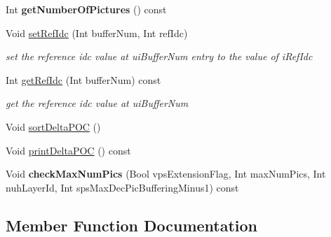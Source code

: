 \begin{DoxyCompactItemize}
Int {\bfseries get\+Number\+Of\+Pictures} () const
\item 
\mbox{\label{class_t_com_reference_picture_set_a7aa9e451882769d60654b91952b0414e}} 
Void \hyperlink{class_t_com_reference_picture_set_a7aa9e451882769d60654b91952b0414e}{set\+Ref\+Idc} (Int buffer\+Num, Int ref\+Idc)
\begin{DoxyCompactList}\small\item\em set the reference idc value at ui\+Buffer\+Num entry to the value of i\+Ref\+Idc \end{DoxyCompactList}\item 
\mbox{\label{class_t_com_reference_picture_set_a8e161d40e3ee8b234d40dcde5c8a8415}} 
Int \hyperlink{class_t_com_reference_picture_set_a8e161d40e3ee8b234d40dcde5c8a8415}{get\+Ref\+Idc} (Int buffer\+Num) const
\begin{DoxyCompactList}\small\item\em get the reference idc value at ui\+Buffer\+Num \end{DoxyCompactList}\item 
Void \hyperlink{class_t_com_reference_picture_set_a471d8a5c5c33e6d576f0831e6ee53db9}{sort\+Delta\+P\+OC} ()
\item 
Void \hyperlink{class_t_com_reference_picture_set_a8260f0649f6712db47d3836517478deb}{print\+Delta\+P\+OC} () const
\item 
\mbox{\label{class_t_com_reference_picture_set_a0178a69e3f2226b679adfaf0fe0e301a}} 
Void {\bfseries check\+Max\+Num\+Pics} (Bool vps\+Extension\+Flag, Int max\+Num\+Pics, Int nuh\+Layer\+Id, Int sps\+Max\+Dec\+Pic\+Buffering\+Minus1) const
\end{DoxyCompactItemize}



\subsection{Member Function Documentation}
\mbox{\label{class_t_com_reference_picture_set_a8260f0649f6712db47d3836517478deb}} 
